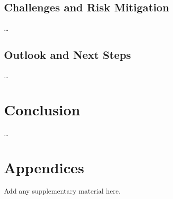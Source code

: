 \documentclass[11pt,a4paper]{article}
\begin{document}
    \subsection{Challenges and Risk Mitigation}\label{subsec:challenges}
    \ldots

    \subsection{Outlook and Next Steps}\label{subsec:outlook}
    \ldots

    \section{Conclusion}\label{sec:conclusion}
    \ldots

    \printbibliography

    \appendix
    \section*{Appendices}\label{sec:appendix}
    Add any supplementary material here.
\end{document}
